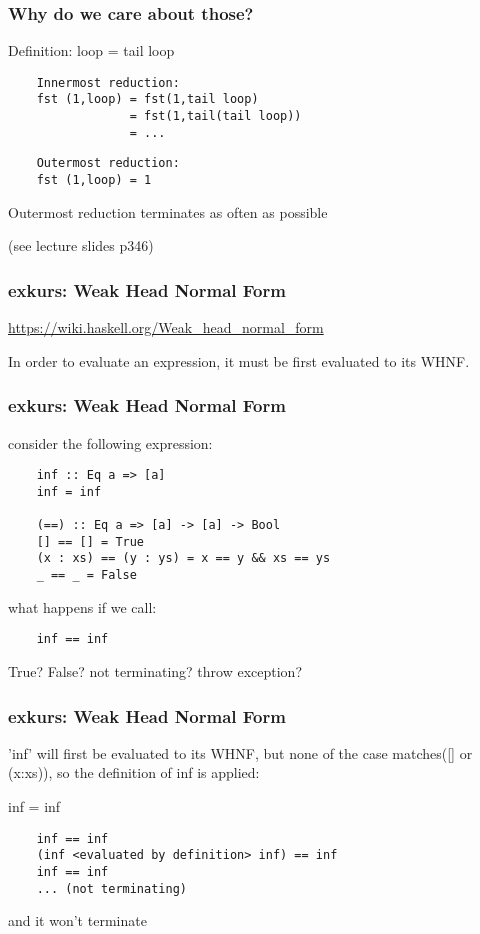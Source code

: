 \documentclass{beamer}
\begin{document}
\begin{frame}[fragile]
    \frametitle{Why do we care about those?}
    Definition:
    loop = tail loop
    
    \medskip

    \begin{verbatim}
    Innermost reduction:
    fst (1,loop) = fst(1,tail loop)
                 = fst(1,tail(tail loop))
                 = ...
    \end{verbatim}

    \medskip

    \begin{verbatim}
    Outermost reduction:
    fst (1,loop) = 1
    \end{verbatim}

    \medskip
    Outermost reduction terminates as often as possible

    \medskip
    (see lecture slides p346)
\end{frame}

\begin{frame}
    \frametitle{exkurs: Weak Head Normal Form}
    \href{https://wiki.haskell.org/Weak_head_normal_form}{https://wiki.haskell.org/Weak\_head\_normal\_form}

    In order to evaluate an expression, it must be first evaluated to its WHNF.
\end{frame}

\begin{frame}[fragile]
    \frametitle{exkurs: Weak Head Normal Form}
    consider the following expression:

    \begin{verbatim}
    inf :: Eq a => [a]
    inf = inf

    (==) :: Eq a => [a] -> [a] -> Bool
    [] == [] = True
    (x : xs) == (y : ys) = x == y && xs == ys
    _ == _ = False
    \end{verbatim}

    what happens if we call:

    \begin{verbatim}
    inf == inf
    \end{verbatim}

    True? False? not terminating? throw exception?
\end{frame}

\begin{frame}[fragile]
    \frametitle{exkurs: Weak Head Normal Form}
    'inf' will first be evaluated to its WHNF, but none of the case matches([] or (x:xs)), so the definition of inf is applied:

    inf = inf

    \begin{verbatim}
    inf == inf
    (inf <evaluated by definition> inf) == inf
    inf == inf
    ... (not terminating)
    \end{verbatim}

    and it won't terminate

\end{frame}
\end{document}
